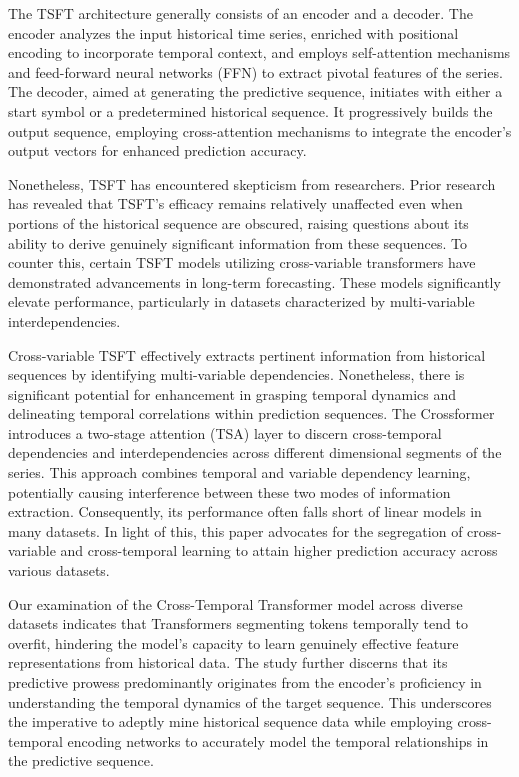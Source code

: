 The TSFT architecture generally consists of an encoder and a decoder. The encoder analyzes the input historical time series, enriched with positional encoding to incorporate temporal context, and employs self-attention mechanisms and feed-forward neural networks (FFN) to extract pivotal features of the series. The decoder, aimed at generating the predictive sequence, initiates with either a start symbol or a predetermined historical sequence. It progressively builds the output sequence, employing cross-attention mechanisms to integrate the encoder’s output vectors for enhanced prediction accuracy.

Nonetheless, TSFT has encountered skepticism from researchers. Prior research\cite{gao2023client} has revealed that TSFT's efficacy remains relatively unaffected even when portions of the historical sequence are obscured, raising questions about its ability to derive genuinely significant information from these sequences. To counter this, certain TSFT models utilizing cross-variable transformers have demonstrated advancements in long-term forecasting\cite{gao2023client, liu2023itransformer, zhang2022crossformer}. These models significantly elevate performance, particularly in datasets characterized by multi-variable interdependencies.

Cross-variable TSFT effectively extracts pertinent information from historical sequences by identifying multi-variable dependencies. Nonetheless, there is significant potential for enhancement in grasping temporal dynamics and delineating temporal correlations within prediction sequences. The Crossformer introduces a two-stage attention (TSA) layer to discern cross-temporal dependencies and interdependencies across different dimensional segments of the series. This approach combines temporal and variable dependency learning, potentially causing interference between these two modes of information extraction. Consequently, its performance often falls short of linear models in many datasets. In light of this, this paper advocates for the segregation of cross-variable and cross-temporal learning to attain higher prediction accuracy across various datasets.

Our examination of the Cross-Temporal Transformer model across diverse datasets indicates that Transformers segmenting tokens temporally tend to overfit, hindering the model's capacity to learn genuinely effective feature representations from historical data. The study further discerns that its predictive prowess predominantly originates from the encoder's proficiency in understanding the temporal dynamics of the target sequence. This underscores the imperative to adeptly mine historical sequence data while employing cross-temporal encoding networks to accurately model the temporal relationships in the predictive sequence.

